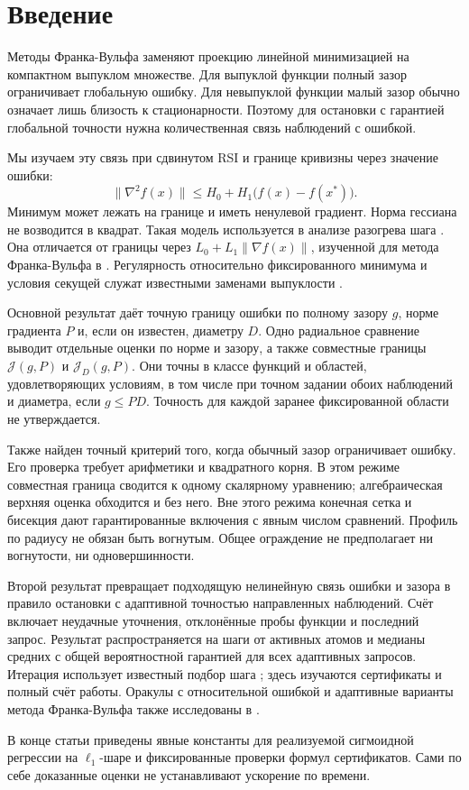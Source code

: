 \section{Введение}
Методы Франка-Вульфа заменяют проекцию линейной минимизацией на
компактном выпуклом множестве. Для выпуклой функции полный зазор
ограничивает глобальную ошибку. Для невыпуклой функции малый зазор
обычно означает лишь близость к стационарности. Поэтому для остановки
с гарантией глобальной точности нужна количественная связь наблюдений
с ошибкой.

Мы изучаем эту связь при сдвинутом RSI и границе
кривизны через значение ошибки:
\[
 \|\nabla^2 f(x)\|\le H_0+H_1\bigl(f(x)-f(x^*)\bigr).
\]
Минимум может лежать на границе и иметь ненулевой градиент.
Норма гессиана не возводится в квадрат. Такая модель используется
в анализе разогрева шага \cite{warmup}. Она отличается от границы
через $L_0+L_1\|\nabla f(x)\|$, изученной для метода Франка-Вульфа
в \cite{vyguzov}. Регулярность относительно фиксированного минимума
и условия секущей служат известными заменами выпуклости
\cite{regregularity,rsipep}.

Основной результат даёт точную границу ошибки по полному зазору $g$,
норме градиента $P$ и, если он известен, диаметру $D$.
Одно радиальное сравнение выводит отдельные оценки по норме и зазору,
а также совместные границы $\mathcal J(g,P)$ и $\mathcal J_D(g,P)$.
Они точны в классе функций и областей, удовлетворяющих условиям,
в том числе при точном задании обоих наблюдений и диаметра,
если $g\le PD$.
Точность для каждой заранее фиксированной области не утверждается.

Также найден точный критерий того, когда обычный зазор ограничивает
ошибку. Его проверка требует арифметики и квадратного корня.
В этом режиме совместная граница сводится к одному скалярному
уравнению; алгебраическая верхняя оценка обходится и без него.
Вне этого режима конечная сетка и бисекция дают гарантированные
включения с явным числом сравнений. Профиль по радиусу не обязан
быть вогнутым. Общее ограждение не предполагает ни вогнутости,
ни одновершинности.

Второй результат превращает подходящую нелинейную связь ошибки
и зазора в правило остановки с адаптивной точностью направленных
наблюдений. Счёт включает неудачные уточнения, отклонённые пробы
функции и последний запрос. Результат распространяется на шаги
от активных атомов и медианы средних с общей вероятностной гарантией для
всех адаптивных запросов. Итерация использует известный подбор
шага \cite{pedregosa,lacostejaggi}; здесь изучаются сертификаты
и полный счёт работы. Оракулы с относительной ошибкой и адаптивные
варианты метода Франка-Вульфа также исследованы в
\cite{oraclehallak,oracledenisov}.

В конце статьи приведены явные константы для реализуемой сигмоидной
регрессии на $\ell_1$-шаре и фиксированные проверки формул
сертификатов. Сами по себе доказанные оценки не устанавливают
ускорение по времени.
